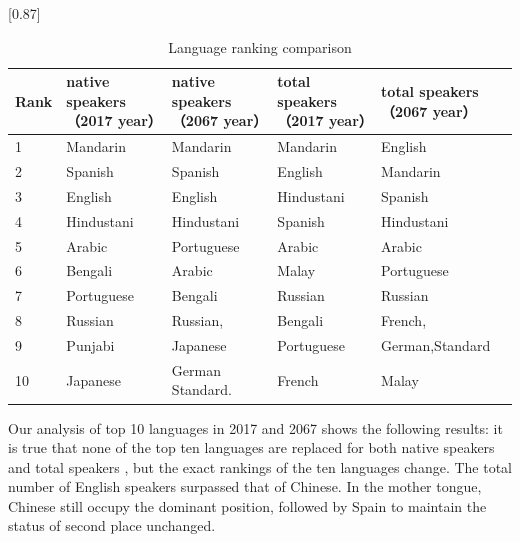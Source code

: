 \begin{table}[H]
	\centering
	\caption{Language ranking comparison}
	 \scalebox{0.87}[0.87]{%
	\begin{tabular}{l p{2.8cm}p{2.8cm}p{2.8cm}p{3.2cm}}
		\toprule
		\multicolumn{1}{l}{Rank} & native speakers（2017 year） & native speakers（2067 year） & total speakers（2017 year） & total speakers（2067 year） \\
		\midrule
		1     & Mandarin & Mandarin & Mandarin & English \\
		2     & Spanish & Spanish & English & Mandarin \\
		3     & English & English & Hindustani & Spanish \\
		4     & Hindustani & Hindustani & Spanish & Hindustani \\
		5     & Arabic & Portuguese & Arabic & Arabic \\
		6     & Bengali & Arabic & Malay & Portuguese \\
		7     & Portuguese & Bengali & Russian & Russian \\
		8     & Russian & Russian, & Bengali & French, \\
		9     & Punjabi & Japanese & Portuguese & German,Standard \\
		10    & Japanese & German Standard. & French & Malay \\
		\bottomrule
	\end{tabular}%
}
	\label{tab:Language}%
\end{table}%

Our analysis of top 10 languages in 2017 and 2067 shows the following results: it is true that none of the top ten languages are replaced for both native speakers and total speakers , but the exact rankings of the ten languages change. The total number of English speakers surpassed that of Chinese. In the mother tongue, Chinese still occupy the dominant position, followed by Spain to maintain the status of second place unchanged.

